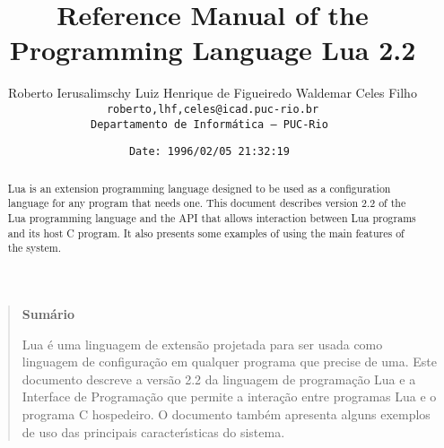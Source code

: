 

\newcommand{\rw}[1]{{\bf #1}}
\newcommand{\see}[1]{see Section~\ref{#1}}
\newcommand{\nil}{{\bf nil}}
\newcommand{\Line}{\rule{\linewidth}{.5mm}}
\def\tecgraf{{\sf TeC\kern-.21em\lower.7ex\hbox{Graf}}}

\newcommand{\Index}[1]{#1\index{#1}}
\newcommand{\IndexVerb}[1]{{\tt #1}\index{#1}}
\newcommand{\Def}[1]{{\em #1}\index{#1}}
\newcommand{\Deffunc}[1]{\index{#1}}




\title{Reference Manual of the Programming Language Lua 2.2}

\author{%
Roberto Ierusalimschy\quad
Luiz Henrique de Figueiredo\quad
Waldemar Celes Filho
\vspace{1.0ex}\\
\smallskip
\small\tt roberto,lhf,celes@icad.puc-rio.br
\vspace{2.0ex}\\
Departamento de Inform\'atica --- PUC-Rio
}

\date{\small \verb$Date: 1996/02/05 21:32:19 $}

\maketitle

\begin{abstract}
\noindent
Lua is an extension programming language designed to be used
as a configuration language for any program that needs one.
This document describes version 2.2 of the Lua programming language and the
API that allows interaction between Lua programs and its host C program.
It also presents some examples of using the main features of the system.
\end{abstract}

\vspace{4ex}
\begin{quotation}
\small
\begin{center}{\bf Sum\'ario}\end{center}
\vspace{1ex}
\noindent
Lua \'e uma linguagem de extens\~ao projetada para ser usada como
linguagem de configura\c{c}\~ao em qualquer programa que precise de
uma.
Este documento descreve a vers\~ao 2.2 da linguagem de programa\c{c}\~ao Lua e a
Interface de Programa\c{c}\~ao que permite a intera\c{c}\~ao entre programas Lua
e o programa C hospedeiro.
O documento tamb\'em apresenta alguns exemplos de uso das principais
ca\-racte\-r\'{\i}sticas do sistema.
\end{quotation}


